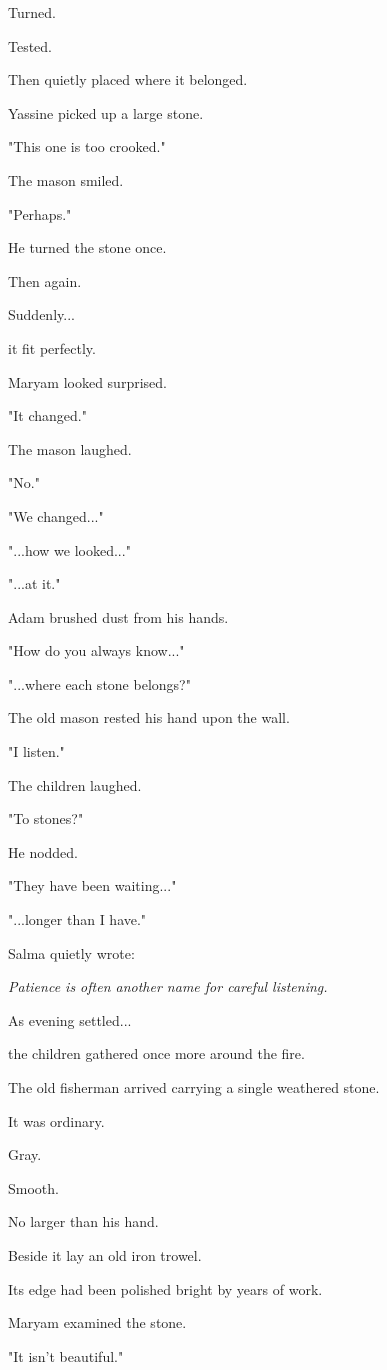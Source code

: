 \documentclass[12pt,openany]{book}
\begin{document}
Turned.

Tested.

Then quietly placed where it belonged.

Yassine picked up a large stone.

"This one is too crooked."

The mason smiled.

"Perhaps."

He turned the stone once.

Then again.

Suddenly...

it fit perfectly.

Maryam looked surprised.

"It changed."

The mason laughed.

"No."

"We changed..."

"...how we looked..."

"...at it."

Adam brushed dust from his hands.

"How do you always know..."

"...where each stone belongs?"

The old mason rested his hand upon the wall.

"I listen."

The children laughed.

"To stones?"

He nodded.

"They have been waiting..."

"...longer than I have."

Salma quietly wrote:

\emph{Patience is often another name for careful listening.}

As evening settled...

the children gathered once more around the fire.

The old fisherman arrived carrying a single weathered stone.

It was ordinary.

Gray.

Smooth.

No larger than his hand.

Beside it lay an old iron trowel.

Its edge had been polished bright by years of work.

Maryam examined the stone.

"It isn't beautiful."
\end{document}
